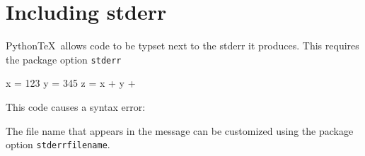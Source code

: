 \documentclass[11pt]{article}
\newcommand{\pytex}{Python\TeX}
\begin{document}
\printpythontex


\section{Including stderr}

\pytex\ allows code to be typset next to the stderr it produces.  This requires the package option \verb|stderr|

\begin{pyblock}[errorsession][numbers=left]
x = 123
y = 345
z = x + y +
\end{pyblock}

This code causes a syntax error:

\stderrpythontex

The file name that appears in the message can be customized using the package option \verb|stderrfilename|.
\end{document}
